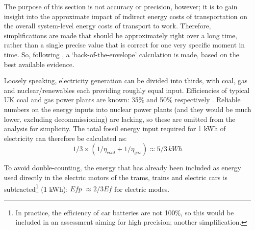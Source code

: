 The purpose of this section is not accuracy or precision, however; it is to
gain insight into the approximate impact of indirect energy costs of
transportation on the overall system-level energy costs of transport to work.
Therefore, simplifications are made that should be
approximately right over a long time, rather than a single precise value that
is correct for one very specific moment in time. So, following
\citet{MacKay2009}, a `back-of-the-envelope' calculation is made, based on the
best available evidence.

Loosely speaking, electricity generation can be divided into thirds, with coal,
gas and nuclear/renewables each providing roughly equal input. Efficiencies of
typical UK coal and gas power plants are known: 35\% and 50\% respectively
\citep{Ecofys2006}.
Reliable numbers on the energy inputs into nuclear power plants
(and they would be much lower, excluding decommissioning)
are lacking, so these are omitted from the
analysis for simplicity. The total fossil energy input required for 1 kWh of
electricity can therefore be calculated as:
\begin{equation}
1/3 \times (1/\eta_{coal} + 1/\eta_{gas}) \approx 5/3\, kWh
\end{equation}

To avoid double-counting, the energy that has
already been included as energy used directly in the electric motors of the
trams, trains and electric cars is subtracted\footnote{In
practice, the efficiency of car batteries are not 100\%, so this would be
included in an assessment aiming for high precision; another simplification.
}
(1 kWh): $Efp$ $\approx 2/3 Ef$ for electric modes.


